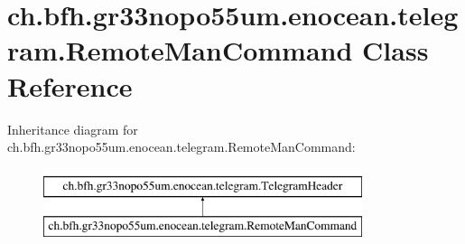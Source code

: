 \hypertarget{classch_1_1bfh_1_1gr33nopo55um_1_1enocean_1_1telegram_1_1_remote_man_command}{}\section{ch.\+bfh.\+gr33nopo55um.\+enocean.\+telegram.\+Remote\+Man\+Command Class Reference}
\label{classch_1_1bfh_1_1gr33nopo55um_1_1enocean_1_1telegram_1_1_remote_man_command}
Inheritance diagram for ch.\+bfh.\+gr33nopo55um.\+enocean.\+telegram.\+Remote\+Man\+Command\+:\begin{figure}[H]
\begin{center}
\leavevmode
\includegraphics[height=2.000000cm]{classch_1_1bfh_1_1gr33nopo55um_1_1enocean_1_1telegram_1_1_remote_man_command}
\end{center}
\end{figure}
